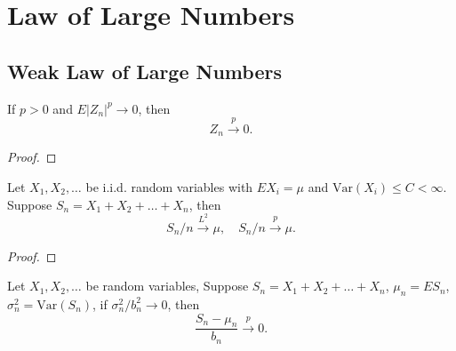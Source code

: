 \chapter{Law of Large Numbers}


\section{Weak Law of Large Numbers}

\begin{lemma}
    If $p>0$ and $E\left|Z_{n}\right|^{p}\rightarrow 0$, then
    \begin{equation}
        Z_{n}\stackrel{p}{\rightarrow}0.
    \end{equation}
\end{lemma}

\begin{proof}

\end{proof}

\begin{theorem}
    Let $X_1,X_2,\ldots$ be i.i.d. random variables with $EX_i=\mu$ and $\text{Var}(X_i)\leq C<\infty$. Suppose $S_n=X_1+X_2+\ldots+X_n$, then
    \begin{equation}
        S_n/n\stackrel{L^2}{\rightarrow}\mu,\quad S_n/n\stackrel{p}{\rightarrow}\mu.
    \end{equation}
\end{theorem}

\begin{proof}

\end{proof}

\begin{theorem}
    Let $X_1,X_2,\ldots$ be random variables, Suppose $S_n=X_1+X_2+\ldots+X_n$, $\mu_n=ES_n$, $\sigma_n^2=\text{Var}(S_n)$, if $\sigma_n^2/b_n^2\rightarrow 0$, then
    \begin{equation}
        \frac{S_n-\mu_n}{b_n}\stackrel{p}{\rightarrow}0.
    \end{equation}
\end{theorem}

